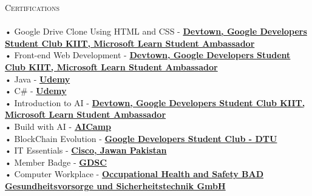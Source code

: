 \documentclass[a4paper]{article}
\newcommand{\lineunder} {
    \vspace*{-8pt} \\
    \hspace*{-18pt} \hrulefill \\
}
\newcommand{\header} [1] {
    {\hspace*{-18pt}\vspace*{6pt} \textsc{#1}}
    \vspace*{-6pt} \lineunder
}
\begin{document}
      \header{Certifications}
      \vspace{2mm}
      • Google Drive Clone Using HTML and CSS - \textbf{\href{https://cert.devtown.in/verify/ZfQgMV}{Devtown, Google Developers Student Club KIIT, Microsoft Learn Student Ambassador}}\\
\vspace*{1mm}
      • Front-end Web Development - \textbf{\href{https://cert.devtown.in/verify/2cRv4D}{Devtown, Google Developers Student Club KIIT, Microsoft Learn Student Ambassador}}\\
\vspace*{1mm}
      • Java - \textbf{\href{https://www.udemy.com/certificate/UC-2b632316-fd78-47b0-af3a-ab4bf29c41c6/}{Udemy}}\\
\vspace*{1mm}
      • C\# - \textbf{\href{https://www.udemy.com/certificate/UC-74a53bdb-8ca9-467d-9dba-ba37d639299f/}{Udemy}}\\
\vspace*{1mm}
      • Introduction to AI - \textbf{\href{https://cert.devtown.in/verify/1xgEdU}{Devtown, Google Developers Student Club KIIT, Microsoft Learn Student Ambassador}}\\
\vspace*{1mm}
      • Build with AI - \textbf{\href{https://www.aicamp.ai/index/certificate/W202405100903rora}{AICamp}}\\
\vspace*{1mm}
      • BlockChain Evolution - \textbf{\href{https://certificate.givemycertificate.com/c/d0618275-fb03-4bb8-bee3-04b58fedb757}{Google Developers Student Club - DTU}}\\
\vspace*{1mm}
      • IT Essentials - \textbf{\href{https://www.credly.com/badges/11065f1c-e19b-471f-a32e-351552ea93ea/public\_url}{Cisco, Jawan Pakistan}}\\
\vspace*{1mm}
      • Member Badge - \textbf{\href{https://developers.google.com/profile/badges/community/gdsc/2023/member}{GDSC}}\\
\vspace*{1mm}
      • Computer Workplace - \textbf{\href{https://www.linkedin.com/in/rohanraaj2/details/certifications/1728504916868/single-media-viewer?type=DOCUMENT\&profileId=ACoAAAXBhjEB1wBZO3Eb5Nhljme8rY91vG10w5M\&lipi=urn\%3Ali\%3Apage\%3Ad\_flagship3\_profile\_view\_base\_certifications\_details\%3B7i06Op1FQLybklu9D8yAyQ\%3D\%3D}{Occupational Health and Safety BAD Gesundheitsvorsorge und Sicherheitstechnik GmbH}}\\
\vspace*{1mm}
      \vspace{2mm}



    \ 
    
\end{document}
